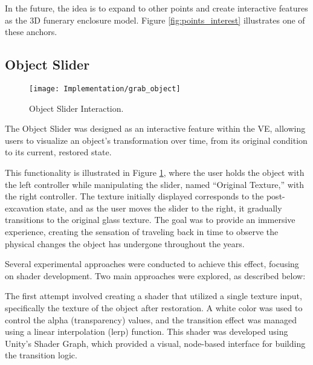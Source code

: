 In the future, the idea is to expand to other points and create interactive features as the \gls{3D} funerary enclosure model. Figure \ref{fig:points_interest} illustrates one of these anchors.

\subsection*{Object Slider}
\label{sec:object_slider}

 \begin{figure}[h!]
    \centering
    \texttt{[image: Implementation/grab\_object]}
    \caption{Object Slider Interaction.}
    \label{fig:object_slider}
\end{figure}

The Object Slider was designed as an interactive feature within the \gls{VE}, allowing users to visualize an object's transformation over time, from its original condition to its current, restored state. 

This functionality is illustrated in Figure \ref{fig:object_slider}, where the user holds the object with the left controller while manipulating the slider, named “Original Texture,” with the right controller. 
The texture initially displayed corresponds to the post-excavation state, and as the user moves the slider to the right, it gradually transitions to the original glass texture.
The goal was to provide an immersive experience, creating the sensation of traveling back in time to observe the physical changes the object has undergone throughout the years.

Several experimental approaches were conducted to achieve this effect, focusing on shader development.
Two main approaches were explored, as described below:

The first attempt involved creating a shader that utilized a single texture input, specifically the texture of the object after restoration. A white color was used to control the alpha (transparency) values, and the transition effect was managed using a linear interpolation (lerp) function. This shader was developed using Unity’s Shader Graph, which provided a visual, node-based interface for building the transition logic.


